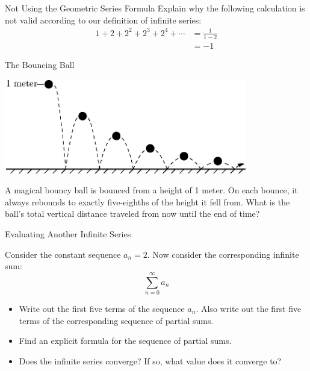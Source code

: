 \begin{exercise}{Not Using the Geometric Series Formula \Coffeecup}
Explain why the following calculation is not valid according to our definition of infinite series:
\begin{align*}
1+2+2^2+2^3+2^4+\cdots &=\frac{1}{1-2} \\
&=-1
\end{align*}
\end{exercise}
\begin{exercise}{The Bouncing Ball \Coffeecup \Coffeecup}
	\begin{center}
		\includegraphics[width=300pt]{ChapterSeqSer/Figures/ball.eps}        
	\end{center}
    A magical bouncy ball is bounced from a height of 1 meter.  On each bounce, it always rebounds to exactly five-eighths of the height it fell from.  What is the ball's total vertical distance traveled from now until the end of time?
    \vspace*{1in}
\end{exercise}

\begin{exercise}{Evaluating Another Infinite Series \Coffeecup \Coffeecup}

Consider the constant sequence $ a_n=2$.  Now consider the corresponding infinite sum: $$ \sum_{n=0}^{\infty} a_n$$
\begin{itemize}

\item Write out the first five terms of the sequence $a_n$.  Also write out the first five terms of the corresponding sequence of partial sums.

\vspace*{.5in}

\item  Find an explicit formula for the sequence of partial sums.

\vspace*{.5in}

\item Does the infinite series converge?  If so, what value does it converge to?

\vspace*{.5in}
\end{itemize}
\end{exercise}

